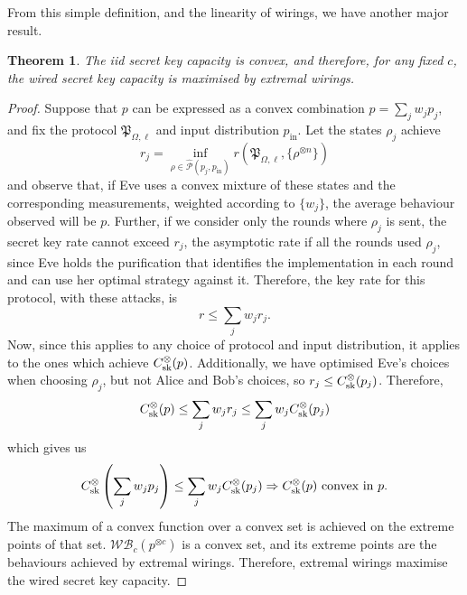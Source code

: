 \documentclass[10pt, a4paper]{article}
\numberwithin{equation}{section} %
\newcounter{stmt} %
\theoremstyle{definition}
\theoremstyle{plain}
\newtheorem{theorem}[stmt]{Theorem}
\newcommand{\?}{\mathrel{?}} %
\newcommand{\sWB}{\mathcal{WB}}
\newcommand{\compatstates}[3][]{\hat{\mathcal{P}}#1(#2,#3)}
\newcommand{\proto}[2][_{\Omega,\ell}]{\mathfrak{#2}#1}
\newcommand{\prin}[1][p]{#1_{\mathrm{in}}}
\newcommand{\sk}{\rm sk}
\begin{document}
                  From this simple definition, and the linearity of wirings, we have another major result.
                  \begin{theorem}\label{thm:extrcap}
                    The iid secret key capacity is convex, and therefore, for any fixed \(c\), the wired secret key capacity is maximised by extremal wirings.
                  \end{theorem}
                  \begin{proof}
                    Suppose that \(p\) can be expressed as a convex combination \(p = \sum_j w_j p_j\), and fix the protocol \(\proto{P}\) and input distribution \(\prin\). Let the states \(\rho_j\) achieve
                    \[ r_j = \inf_{\rho \in \compatstates{p_j}{\prin}} r\left(\proto{P}, \{\rho^{\otimes n}\} \right) \]
                    and observe that, if Eve uses a convex mixture of these states and the corresponding measurements, weighted according to \(\{w_j\}\), the average behaviour observed will be \(p\). Further, if we consider only the rounds where \(\rho_j\) is sent, the secret key rate cannot exceed \(r_j\), the asymptotic rate if all the rounds used \(\rho_j\), since Eve holds the purification that identifies the implementation in each round and can use her optimal strategy against it. Therefore, the key rate for this protocol, with these attacks, is
                    \[ r \leq \sum_j w_j r_j. \]
                    Now, since this applies to any choice of protocol and input distribution, it applies to the ones which achieve \(C_{\sk}^{\otimes}(p)\). Additionally, we have optimised Eve's choices when choosing \(\rho_j\), but not Alice and Bob's choices, so \(r_j \leq C_{\sk}^{\otimes}(p_j)\). Therefore,
                    \[ C_{\sk}^{\otimes}(p) \leq \sum_j w_j r_j \leq \sum_j w_j C_{\sk}^{\otimes}(p_j) \]
                    which gives us
                  \begin{equation}
                    C_{\sk}^{\otimes}\left(\sum_j w_j p_j\right) \leq \sum_j w_j C_{\sk}^{\otimes}(p_j) \Rightarrow C_{\sk}^{\otimes}(p)\text{ convex in }p.
                  \end{equation}
                  The maximum of a convex function over a convex set is achieved on the extreme points of that set. \(\sWB_c(p^{\otimes c})\) is a convex set, and its extreme points are the behaviours achieved by extremal wirings. Therefore, extremal wirings maximise the wired secret key capacity.
                  \end{proof}
\end{document}
